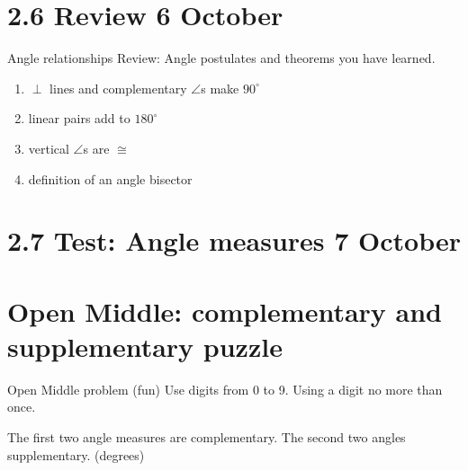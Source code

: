 \section{2.6 Review \hfill 6 October}
\begin{frame}{Angle relationships}
  Review: Angle postulates and theorems you have learned. 
  \begin{enumerate}
    \item $\perp$ lines and complementary $\angle$s make $90^\circ$
    \item linear pairs add to $180^\circ$
    \item vertical $\angle$s are $\cong$
    \item definition of an angle bisector
  \end{enumerate}
\end{frame}

\section{2.7 Test: Angle measures \hfill 7 October}

\section{Open Middle: complementary and supplementary puzzle}
\begin{frame}{Open Middle problem (fun)}
  {Use digits from 0 to 9. Using a digit no more than once.}
    \begin{block}{The first two angle measures are complementary. The second two angles supplementary. (degrees)}
      \begin{center}
    \end{center}
    \end{block} \vspace{1cm} 
\end{frame}


